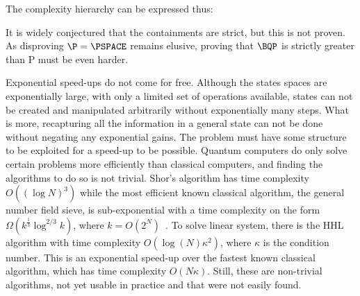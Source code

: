 The complexity hierarchy can be expressed thus:
\begin{center}

\end{center}
It is widely conjectured that the containments are strict, but this is not proven.
As disproving $\P = \PSPACE$ remains elusive, proving that $\BQP$ is strictly greater than P must be even harder.

Exponential speed-ups do not come for free.
Although the states spaces are exponentially large, with only a limited set of operations available, states can not be created and manipulated arbitrarily without exponentially many steps.
What is more, recapturing all the information in a general state can not be done without negating any exponential gains.
The problem must have some structure to be exploited for a speed-up to be possible.
Quantum computers do only solve certain problems more efficiently than classical computers, and finding the algorithms to do so is not trivial.
Shor's algorithm has time complexity $O((\log N)^3)$ while the most efficient known classical algorithm, the general number field sieve, is sub-exponential with a time complexity on the form $\Omega(k^{\frac{1}{3}}\log^{2/3}k)$, where $k=O(2^N)$~\autocite{dervovic2018}.
To solve linear system, there is the HHL algorithm with time complexity $O(\log(N)\kappa^2)$, where $\kappa$ is the condition number.
This is an exponential speed-up over the fastest known classical algorithm\footnotemark{}, which has time complexity $O(N \kappa)$.
Still, these are non-trivial algorithms, not yet usable in practice and that were not easily found.


